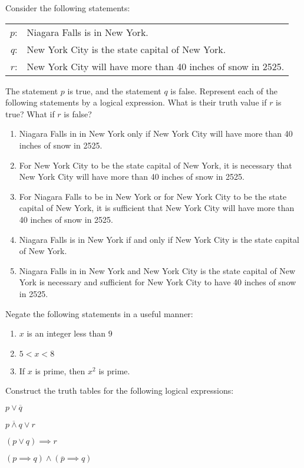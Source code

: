 \documentclass[12pt]{article}
\begin{document}
\begin{qu} Consider the following statements:
\begin{center}\begin{tabular}{rl}
$p$:  & Niagara Falls is in New York. \\
$q$:  & New York City is the state capital of New York. \\
$r$:  & New York City will have more than 40 inches of snow in 2525.
\end{tabular} \end{center}

The statement $p$ is true, and the statement $q$ is false. Represent each of the following statements by a logical expression. What is their truth value if $r$ is true? What if $r$ is false?

\begin{enumerate}[label=\alph*)]
\item Niagara Falls in in New York only if New York City will have more than 40 inches of snow in 2525.
\item For New York City to be the state capital of New York, it is necessary that New York City will have more than 40 inches of snow in 2525.
\item For Niagara Falls to be in New York or for New York City to be the state capital of New York, it is sufficient that New York City will have more than 40 inches of snow in 2525.
\item Niagara Falls is in New York if and only if New York City is the state capital of New York.
\item Niagara Falls in in New York and New York City is the state capital of New York is necessary and sufficient for New York City to have 40 inches of snow in 2525.
\end{enumerate}
\end{qu}


\begin{qu}Negate the following statements in a useful manner:
\begin{enumerate}[label=\alph*)]
\item $x$ is an integer less than $9$
\item $5<x<8$
\item If $x$ is prime, then $x^2$ is prime.
\end{enumerate} \end{qu}

\begin{qu}
Construct the truth tables for the following logical expressions:

\begin{inparaenum}[a)]
\item $p \lor \overline{q}$
\tab \item $\overline{p \land q}\lor r$
\tab \item $(p \lor q) \implies r$
\tab \item $(p \implies q) \land (\overline{p} \implies q)$
\end{inparaenum}

\end{qu}
\end{document}
